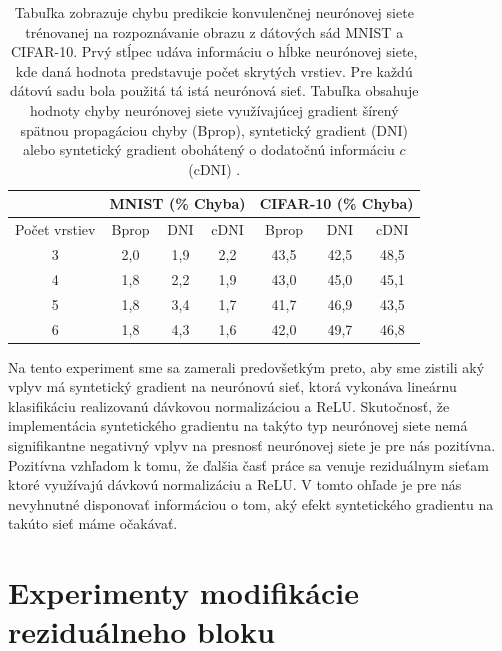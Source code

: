 \begin{table}
\caption[Porovnanie chyby neurónovej siete trénovanej rôznymi typmi gradientu]{Tabuľka zobrazuje chybu predikcie konvulenčnej neurónovej siete trénovanej na rozpoznávanie obrazu z dátových sád MNIST a CIFAR-10. Prvý stĺpec udáva informáciu o hĺbke neurónovej siete, kde daná hodnota predstavuje počet skrytých vrstiev. Pre každú dátovú sadu bola použitá tá istá neurónová sieť. Tabuľka obsahuje hodnoty chyby neurónovej siete využívajúcej gradient šírený spätnou propagáciou chyby (Bprop), syntetický gradient (DNI) alebo syntetický gradient obohátený o dodatočnú informáciu $c$ (cDNI) \cite{Jaderberg2016}.}
\label{compareDNIandCDNI}
\begin{center}
\begin{tabular}{cc|ccc|ccc}
\toprule
      &       & \multicolumn{3}{c|}{MNIST (\% Chyba)} & \multicolumn{3}{c}{CIFAR-10 (\% Chyba)} \\
\midrule
\multicolumn{2}{c|}{Počet vrstiev} & Bprop & DNI  & cDNI  & Bprop & DNI & cDNI \\ \hline
\hline
\multicolumn{2}{c|}{3} & 2,0 & 1,9 & 2,2 & 43,5 & 42,5 & 48,5 \\
\multicolumn{2}{c|}{4} & 1,8 & 2,2 & 1,9 & 43,0 & 45,0 & 45,1 \\
\multicolumn{2}{c|}{5} & 1,8 & 3,4 & 1,7 & 41,7 & 46,9 & 43,5 \\
\multicolumn{2}{c|}{6} & 1,8 & 4,3 & 1,6 & 42,0 & 49,7 & 46,8 \\
\hline
\bottomrule
\end{tabular}%
\end{center}
\end{table}

Na tento experiment sme sa zamerali predovšetkým preto, aby sme zistili aký vplyv má syntetický gradient na neurónovú sieť, ktorá vykonáva lineárnu klasifikáciu realizovanú dávkovou normalizáciou a ReLU. Skutočnosť, že implementácia syntetického gradientu na takýto typ neurónovej siete nemá signifikantne negativný vplyv na presnosť neurónovej siete je pre nás pozitívna. Pozitívna vzhľadom k tomu, že ďalšia časť práce sa venuje reziduálnym sieťam ktoré využívajú dávkovú normalizáciu a ReLU. V tomto ohľade je pre nás nevyhnutné disponovať informáciou o tom, aký efekt syntetického gradientu na takúto sieť máme očakávať.

\chapter{Experimenty modifikácie reziduálneho bloku}


